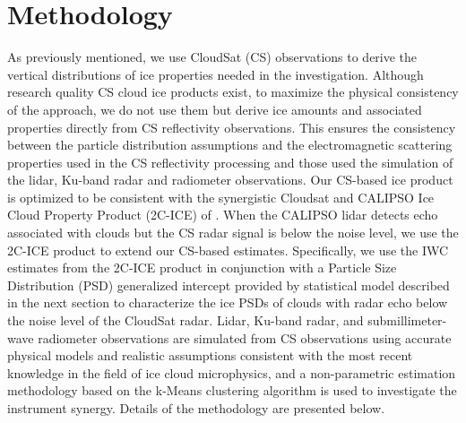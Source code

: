 \documentclass{ametsocV6.1}
\begin{document}
\section{Methodology}
As previously mentioned, we use CloudSat (CS) observations \citep{stephens2002} to derive the vertical distributions of ice properties needed in the investigation.  Although research quality CS cloud ice products exist, to maximize the physical consistency of the approach, we do not use them but derive ice amounts and associated properties directly from CS reflectivity observations.  This ensures the consistency between the particle distribution assumptions and the electromagnetic scattering properties used in the CS reflectivity processing and those used the simulation of the lidar, Ku-band radar and radiometer observations. Our CS-based ice product is optimized to be consistent with the synergistic Cloudsat and CALIPSO Ice Cloud Property Product (2C-ICE) of \cite{deng2015}.  When the CALIPSO lidar detects echo associated with clouds but the CS radar signal is below the noise level, we use the 2C-ICE product to extend our CS-based estimates. Specifically, we use the IWC estimates from the 2C-ICE product in conjunction with a Particle Size Distribution (PSD) generalized intercept \citep{testud2001} provided by statistical model described in the next section to characterize the ice PSDs of clouds with radar echo below the noise level of the CloudSat radar. Lidar, Ku-band radar, and submillimeter-wave radiometer observations are simulated from CS observations using accurate physical models and realistic assumptions consistent with the most recent knowledge in the field of ice cloud microphysics, and a non-parametric estimation methodology based on the k-Means clustering algorithm \cite{mackay2003information} is used to investigate the instrument synergy.  Details of the methodology are presented below.
\end{document}
